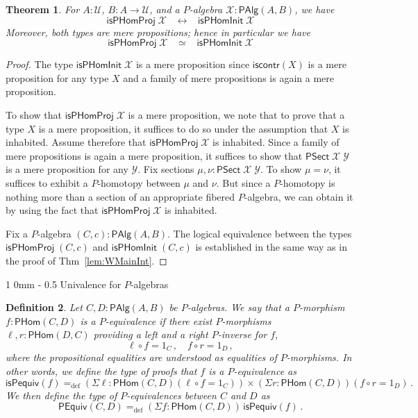 \documentclass[10pt,a4paper,oneside,reqno]{amsart}
\makeatletter
\numberwithin{equation}{section}
\renewcommand{\section}{\@startsection
  {section}%
   {1}%
  {0mm}%
   {-\baselineskip}%
  {0.5\baselineskip}%
   {\Large\bfseries}}%
\theoremstyle{mythm}
\newtheorem{theorem}{Theorem}[section]
\theoremstyle{mydef}
\newtheorem{definition}[theorem]{Definition}
\theoremstyle{myrmk}
\newcommand{\ie}{\text{i.e.\ }}
\newcommand{\myemph}[1]{\textit{#1}}
\newcommand{\defeq}{=_{\mathrm{def}}}
\newcommand{\co}{\colon}
\newcommand{\iscontr}{\mathsf{iscontr}}
\newcommand{\U}{\mathcal{U}}
\newcommand{\WAlg}{\mathsf{PAlg}}
\newcommand{\WHom}{\mathsf{PHom}}
\newcommand{\WFibHom}{\mathsf{PSect}}
\newcommand{\IsWHInit}{\mathsf{isPHomInit}}
\newcommand{\IsWHProj}{\mathsf{isPHomProj}}
\newcommand{\X}{\mathcal{X}}
\newcommand{\Y}{\mathcal{Y}}
\makeatother
\begin{document}
\begin{theorem}\label{lem:WMainInternal}
For $A:\U$, $B : A \to \U$, and a $P$-algebra $\X : \WAlg(A,B)$, we have
\[ \IsWHProj \; \X \;\;\; \leftrightarrow \;\;\; \IsWHInit \; \X \]
Moreover, both types are mere propositions; hence in particular we have
\[ \IsWHProj \; \X \;\;\; \simeq \;\;\; \IsWHInit \; \X \]
\end{theorem}
\begin{proof}
The type $\IsWHInit \; \X$ is a mere proposition since $\iscontr(X)$ is a mere proposition for any type $X$ and a family of mere propositions is again a mere proposition.

To show that $\IsWHProj \; \X$ is a mere proposition, we note that to prove that a type $X$ is a mere proposition, it suffices to do so under the assumption that $X$ is inhabited. Assume therefore that $\IsWHProj \; \X$ is inhabited. Since a family of mere propositions is again a mere proposition, it suffices to show that $\WFibHom \; \X \; \Y$ is a mere proposition for any $\Y$. Fix sections $\mu, \nu : \WFibHom \; \X \; \Y$. To show $\mu = \nu$, it suffices to exhibit a $P$-homotopy between $\mu$ and $\nu$. But since a $P$-homotopy is nothing more than a section of an appropriate fibered $P$-algebra, we can obtain it by using the fact that $\IsWHProj \; \X$ is inhabited.

Fix a $P$-algebra $(C,c) : \WAlg(A,B)$. The logical equivalence between the types $\IsWHProj \; (C,c)$ and $\IsWHInit \; (C,c)$ is established in the same way as in the proof of Thm~\ref{lem:WMainInt}. 
\end{proof}


\section{Univalence for $P$-algebras}

\begin{definition} Let $C,D : \WAlg(A,B)$ be $P$-algebras. We say that a $P$-morphism $f \co \WHom(C,D)$ is a \myemph{$P$-equivalence}
if there exist $P$-morphisms $\ell,r \co \WHom(D,C)$ providing a left and a right $P$-inverse for $f$, \ie 
\[ 
\ell \circ f = 1_C \, , \quad f \circ r = 1_D \, ,
\]
where the propositional equalities are understood as equalities of $P$-morphisms. In other words, we define the type of proofs that $f$ is a $P$-equivalence as
\[
\mathsf{isPequiv}(f) \defeq   ( \Sigma \ell : \WHom(C,D) ( \ell \circ f = 1_C )) \times 
    (\Sigma r : \WHom(C, D))(  f \circ r = 1_D ) \, .
\]
We then define the type of \emph{$P$-equivalences} between $C$ and $D$ as
\[
\mathsf{PEquiv}(C, D)
\defeq    (\Sigma f : \WHom(C,D)) \, \mathsf{isPequiv}(f)  \, . 
\] 
\end{definition}
\end{document}
